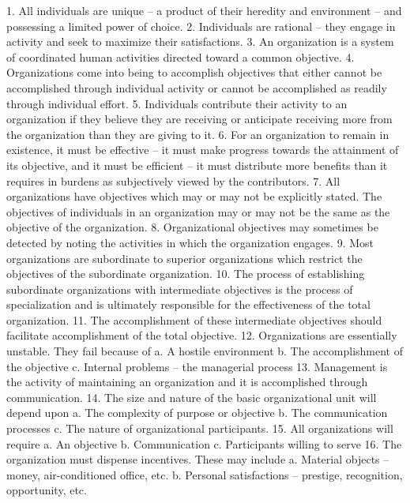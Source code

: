     1. All individuals are unique – a product of their heredity and environment – and possessing a limited power of choice.
    2. Individuals are rational – they engage in activity and seek to maximize their satisfactions.
    3. An organization is a system of coordinated human activities directed toward a common objective.
    4. Organizations come into being to accomplish objectives that either cannot be accomplished through individual activity or cannot be accomplished as readily through individual effort.
    5. Individuals contribute their activity to an organization if they believe they are receiving or anticipate receiving more from the organization than they are giving to it.
    6. For an organization to remain in existence, it must be effective – it must make progress towards the attainment of its objective, and it must be efficient – it must distribute more benefits than it requires in burdens as subjectively viewed by the contributors.
    7. All organizations have objectives which may or may not be explicitly stated. The objectives of individuals in an organization may or may not be the same as the objective of the organization.
    8. Organizational objectives may sometimes be detected by noting the activities in which the organization engages.
    9. Most organizations are subordinate to superior organizations which restrict the objectives of the subordinate organization.
    10. The process of establishing subordinate organizations with intermediate objectives is the process of specialization and is ultimately responsible for the effectiveness of the total organization.
    11. The accomplishment of these intermediate objectives should facilitate accomplishment of the total objective.
    12. Organizations are essentially unstable. They fail because of 
        a. A hostile environment
        b. The accomplishment of the objective
        c. Internal problems – the managerial process
    13. Management is the activity of maintaining an organization and it is accomplished through communication.
    14. The size and nature of the basic organizational unit will depend upon
        a. The complexity of purpose or objective
        b. The communication processes
        c. The nature of organizational participants.
    15. All organizations will require
        a. An objective
        b. Communication
        c. Participants willing to serve
    16. The organization must dispense incentives. These may include
        a. Material objects – money, air-conditioned office, etc.
        b. Personal satisfactions – prestige, recognition, opportunity, etc.
